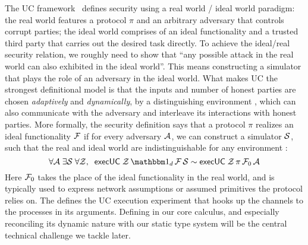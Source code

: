 The UC framework~\cite{canettiUC} defines security using
a real world / ideal world paradigm:
the real world features a protocol $\pi$ and an arbitrary adversary \A that controls corrupt parties;
the ideal world comprises of an ideal functionality \F and a trusted third party that carries out the desired task directly.
To achieve the ideal/real security relation, we roughly need to show that ``any possible attack in the real world can also exhibited
in the ideal world''.
This means constructing a simulator \Sim that plays the role of an adversary in the ideal world.
What makes UC the strongest definitional model is that the inputs and number of honest parties are chosen \emph{adaptively}
and \emph{dynamically}, by a distinguishing environment \Z, which can also communicate with the adversary and interleave its interactions with honest parties.
More formally, the security definition says that a protocol $\pi$ realizes an ideal functionality $\mathcal{F}$
if for every adversary $\mathcal{A}$, we can construct a simulator $\mathcal{S}$, such that the real and ideal world are indistinguishable for any environment \Z:
\begin{equation}
  \label{eqn:emulation}
  \forall \A \; \exists \Sim \; \forall \Z, \; \; \msf{execUC} \; \Z \, \idealP \, \F \, \Sim \sim \msf{execUC} \; \Z \, \pi \, \F_0 \, \A
\end{equation}
Here $\mathcal{F}_0$ takes the place of the ideal functionality in the real world, and is typically used to express network assumptions or assumed primitives the protocol relies on.
The  defines the UC execution experiment that hooks up the channels to the processes in its arguments.
Defining  in our core calculus, and especially reconciling its dynamic nature with our static type system will be the central technical challenge we tackle later.

